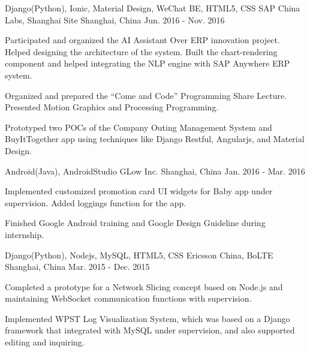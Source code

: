 


\begin{cventries}


\cventry
{Django(Python), Ionic, Material Design, WeChat BE, HTML5, CSS} %
{SAP China Labs, Shanghai Site} %
{Shanghai, China} %
{Jun. 2016 - Nov. 2016} %
{ %
\begin{cvitems}
\item {Participated and organized the AI Assistant Over ERP innovation project. Helped designing the architecture of the system. Built the chart-rendering component and helped integrating the NLP engine with SAP Anywhere ERP system.}
\item {Organized and prepared the “Come and Code” Programming Share Lecture. Presented Motion Graphics and Processing Programming.}
\item {Prototyped two POCs of the Company Outing Management System and BuyItTogether app using techniques like Django Restful, Angularjs, and Material Design.}
\end{cvitems}
}


\cventry
{Android(Java), AndroidStudio} %
{GLow Inc.} %
{Shanghai, China} %
{Jan. 2016 - Mar. 2016} %
{ %
\begin{cvitems}
\item {Implemented customized promotion card UI widgets for Baby app under supervision. Added loggings function for the app.}
\item {Finished Google Android training and Google Design Guideline during internship.}
\end{cvitems}
}


\cventry
{Django(Python), Nodejs, MySQL, HTML5, CSS} %
{Ericsson China, BoLTE} %
{Shanghai, China} %
{Mar. 2015 - Dec. 2015} %
{ %
\begin{cvitems}
\item {Completed a prototype for a Network Slicing concept based on Node.js and maintaining WebSocket communication functions with supervision.}
\item {Implemented WPST Log Visualization System, which was based on a Django framework that integrated with MySQL under supervision, and also supported editing and inquiring.}
\end{cvitems}
}


\end{cventries}
